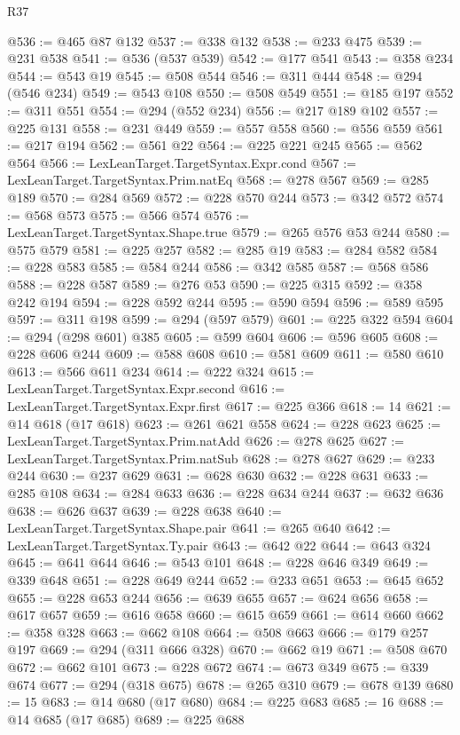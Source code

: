 \begin{lexlean}{R37}
\begin{coremodule}
@536 := @465 @87 @132
@537 := @338 @132
@538 := @233 @475
@539 := @231 @538
@541 := @536 (@537 @539)
@542 := @177 @541
@543 := @358 @234
@544 := @543 @19
@545 := @508 @544
@546 := @311 @444
@548 := @294 (@546 @234)
@549 := @543 @108
@550 := @508 @549
@551 := @185 @197
@552 := @311 @551
@554 := @294 (@552 @234)
@556 := @217 @189 @102
@557 := @225 @131
@558 := @231 @449
@559 := @557 @558
@560 := @556 @559
@561 := @217 @194
@562 := @561 @22
@564 := @225 @221 @245
@565 := @562 @564
@566 := LexLeanTarget.TargetSyntax.Expr.cond
@567 := LexLeanTarget.TargetSyntax.Prim.natEq
@568 := @278 @567
@569 := @285 @189
@570 := @284 @569
@572 := @228 @570 @244
@573 := @342 @572
@574 := @568 @573
@575 := @566 @574
@576 := LexLeanTarget.TargetSyntax.Shape.true
@579 := @265 @576 @53 @244
@580 := @575 @579
@581 := @225 @257
@582 := @285 @19
@583 := @284 @582
@584 := @228 @583
@585 := @584 @244
@586 := @342 @585
@587 := @568 @586
@588 := @228 @587
@589 := @276 @53
@590 := @225 @315
@592 := @358 @242 @194
@594 := @228 @592 @244
@595 := @590 @594
@596 := @589 @595
@597 := @311 @198
@599 := @294 (@597 @579)
@601 := @225 @322 @594
@604 := @294 (@298 @601) @385
@605 := @599 @604
@606 := @596 @605
@608 := @228 @606 @244
@609 := @588 @608
@610 := @581 @609
@611 := @580 @610
@613 := @566 @611 @234
@614 := @222 @324
@615 := LexLeanTarget.TargetSyntax.Expr.second
@616 := LexLeanTarget.TargetSyntax.Expr.first
@617 := @225 @366
@618 := 14
@621 := @14 @618 (@17 @618)
@623 := @261 @621 @558
@624 := @228 @623
@625 := LexLeanTarget.TargetSyntax.Prim.natAdd
@626 := @278 @625
@627 := LexLeanTarget.TargetSyntax.Prim.natSub
@628 := @278 @627
@629 := @233 @244
@630 := @237 @629
@631 := @628 @630
@632 := @228 @631
@633 := @285 @108
@634 := @284 @633
@636 := @228 @634 @244
@637 := @632 @636
@638 := @626 @637
@639 := @228 @638
@640 := LexLeanTarget.TargetSyntax.Shape.pair
@641 := @265 @640
@642 := LexLeanTarget.TargetSyntax.Ty.pair
@643 := @642 @22
@644 := @643 @324
@645 := @641 @644
@646 := @543 @101
@648 := @228 @646 @349
@649 := @339 @648
@651 := @228 @649 @244
@652 := @233 @651
@653 := @645 @652
@655 := @228 @653 @244
@656 := @639 @655
@657 := @624 @656
@658 := @617 @657
@659 := @616 @658
@660 := @615 @659
@661 := @614 @660
@662 := @358 @328
@663 := @662 @108
@664 := @508 @663
@666 := @179 @257 @197
@669 := @294 (@311 @666 @328)
@670 := @662 @19
@671 := @508 @670
@672 := @662 @101
@673 := @228 @672
@674 := @673 @349
@675 := @339 @674
@677 := @294 (@318 @675)
@678 := @265 @310
@679 := @678 @139
@680 := 15
@683 := @14 @680 (@17 @680)
@684 := @225 @683
@685 := 16
@688 := @14 @685 (@17 @685)
@689 := @225 @688

\end{coremodule}
\end{lexlean}
